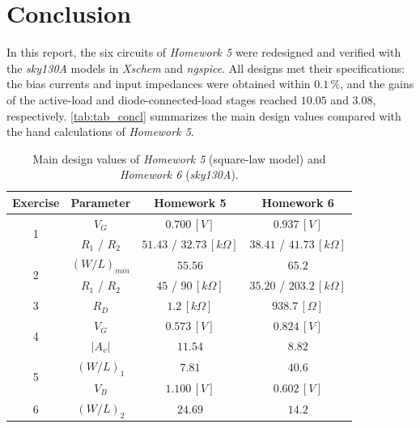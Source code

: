 \documentclass[12pt,a4paper]{article}
\begin{document}
\section{Conclusion}                                                \label{sec_8}
In this report, the six circuits of \textit{Homework 5} were redesigned and verified with the \textit{sky130A} models in \textit{Xschem} and \textit{ngspice}. All designs met their specifications: the bias currents and input impedances were obtained within $0.1 \, \%$, and the gains of the active-load and diode-connected-load stages reached $10.05$ and $3.08$, respectively. \autoref{tab:tab_concl} summarizes the main design values compared with the hand calculations of \textit{Homework 5}.
\begin{table}[H]
    \centering
    \begin{tabular}{|c|c|c|c|} \hline
        \textbf{Exercise} & \textbf{Parameter} & \textbf{Homework 5} & \textbf{Homework 6} \\ \hline
        \multirow{2}{*}{1} & $V_{G}$             & $0.700 \, [V]$              & $0.937 \, [V]$ \\
                           & $R_{1}$ / $R_{2}$   & $51.43$ / $32.73 \, [k\Omega]$ & $38.41$ / $41.73 \, [k\Omega]$ \\ \hline
        \multirow{2}{*}{2} & $(W/L)_{min}$       & $55.56$                     & $65.2$ \\
                           & $R_{1}$ / $R_{2}$   & $45$ / $90 \, [k\Omega]$    & $35.20$ / $203.2 \, [k\Omega]$ \\ \hline
        3                  & $R_{D}$             & $1.2 \, [k\Omega]$          & $938.7 \, [\Omega]$ \\ \hline
        \multirow{2}{*}{4} & $V_{G}$             & $0.573 \, [V]$              & $0.824 \, [V]$ \\
                           & $|A_{v}|$           & $11.54$                     & $8.82$ \\ \hline
        \multirow{2}{*}{5} & $(W/L)_{1}$         & $7.81$                      & $40.6$ \\
                           & $V_{B}$             & $1.100 \, [V]$              & $0.602 \, [V]$ \\ \hline
        6                  & $(W/L)_{2}$         & $24.69$                     & $14.2$ \\ \hline
    \end{tabular}
    \caption{Main design values of \textit{Homework 5} (square-law model) and \textit{Homework 6} (\textit{sky130A}).}
    \label{tab:tab_concl}
\end{table}
\end{document}
